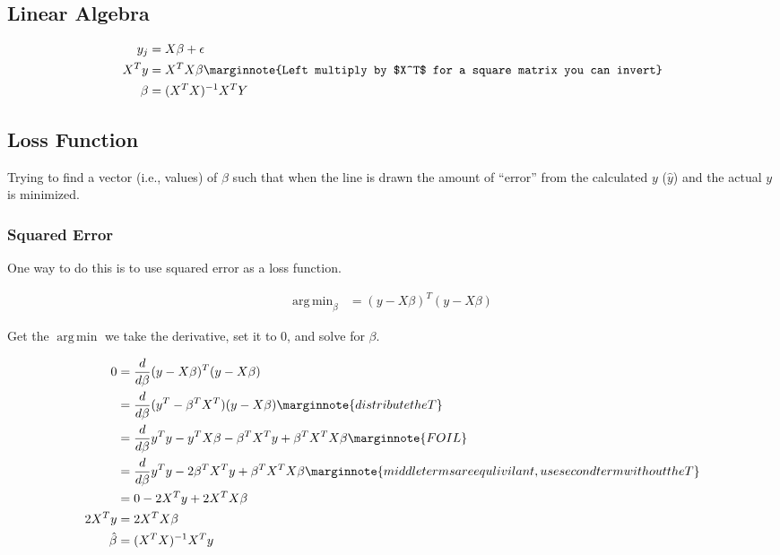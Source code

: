\documentclass[10pt,letterpaper,twoside]{article}
\DeclareMathOperator*{\argmin}{arg\,min}
\begin{document}
\subsection{Linear Algebra}

\begin{align}
    y_j     &= X\beta + \epsilon \\
    X^Ty    &= X^TX\beta \marginnote{Left multiply by $X^T$ for a square matrix you can invert}\\
    \beta   &= (X^TX)^{-1} X^TY
\end{align}

\subsection{Loss Function}

Trying to find a vector (i.e., values) of $\beta$ such that when the line is drawn
the amount of ``error'' from the calculated $y$ ($\hat{y}$) and the actual $y$ is minimized.

\subsubsection{Squared Error}

One way to do this is to use squared error as a loss function.

\begin{align}
    \argmin_\beta &= (y - X\beta)^T (y - X\beta)
\end{align}

Get the $\argmin$ we take the derivative, set it to 0, and solve for $\beta$.

\begin{align}
     0 &= \frac{d}{d\beta} (y - X\beta)^T (y - X\beta) \\
       &= \frac{d}{d\beta} (y^T - \beta^T X^T) (y - X \beta)
         \marginnote{distribute the T}\\
       &= \frac{d}{d\beta} y^Ty - y^TX\beta - \beta^TX^Ty + \beta^TX^TX\beta
         \marginnote{FOIL}\\
       &= \frac{d}{d\beta} y^Ty - 2\beta^TX^Ty + \beta^TX^TX\beta
         \marginnote{middle terms are equlivilant, use second term without the T}\\
       &= 0 - 2X^Ty + 2X^TX\beta\\
 2X^Ty &= 2X^TX\beta\\
 \hat{\beta} &= (X^TX)^{-1}X^Ty
\end{align}
\end{document}
